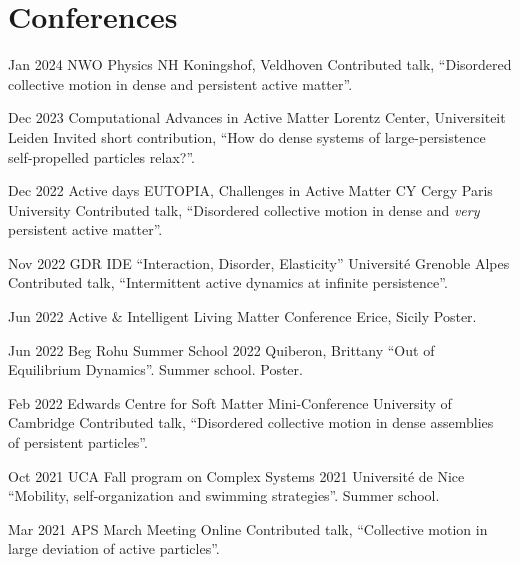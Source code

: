 \documentclass[a4paper]{cvtemplate_en} %
\begin{document}
\vspace{3.25mm}
\section{Conferences}

\begin{cvbody}

\cvitem
	{Jan 2024}
	{}
	{NWO Physics}
	{NH Koningshof, Veldhoven \vspace{-5pt}}
	{}{}{}
	{}
	{Contributed talk, ``Disordered collective motion in dense and persistent active matter''.\\}

\cvitem
	{Dec 2023}
	{}
	{Computational Advances in Active Matter}
	{Lorentz Center, Universiteit Leiden }
	{}{}{}
	{}
	{Invited short contribution, ``How do dense systems of large-persistence self-propelled particles relax?''.\\}

\cvitem
	{Dec 2022}
	{}
	{Active days EUTOPIA, Challenges in Active Matter}
	{CY Cergy Paris University }
	{}{}{}
	{}
	{Contributed talk, ``Disordered collective motion in dense and \textit{very}\\ persistent active matter''.\\}

\cvitem
	{Nov 2022}
	{}
	{GDR IDE ``Interaction, Disorder, Elasticity''}
	{Universit\'e Grenoble Alpes }
	{}{}{}
	{}
	{Contributed talk, ``Intermittent active dynamics at infinite persistence''.\\}

\cvitem
	{Jun 2022}
	{}
	{Active \& Intelligent Living Matter Conference}
	{Erice, Sicily }
	{}{}{}
	{}
	{Poster.\\}

\cvitem
	{Jun 2022}
	{}
	{Beg Rohu Summer School 2022}
	{Quiberon, Brittany }
	{}{}{}
	{}
	{``Out of Equilibrium Dynamics''. Summer school. Poster.\\}

\cvitem
	{Feb 2022}
	{}
	{Edwards Centre for Soft Matter Mini-Conference}
	{University of Cambridge }
	{}{}{}
	{}
	{Contributed talk, ``Disordered collective motion in dense assemblies\\ of persistent particles''.\\}

\cvitem
	{Oct 2021}
	{}
	{UCA Fall program on Complex Systems 2021}
	{Universit\'e de Nice }
	{}{}{}
	{}
	{``Mobility, self-organization and swimming strategies''. Summer school.\\}

\cvitem
	{Mar 2021}
	{}
	{APS March Meeting}
	{Online \faGlobe}
	{}{}{}
	{}
	{Contributed talk, ``Collective motion in large deviation of active particles''.\\}

\end{cvbody}
\end{document}
